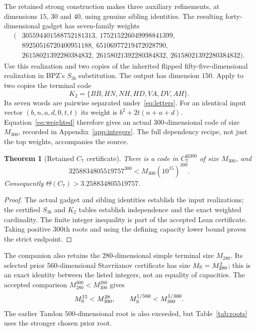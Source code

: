 \documentclass[11pt,a4paper]{article}
\newtheorem{theorem}{Theorem}[section]
\theoremstyle{definition}
\theoremstyle{remark}
\begin{document}
The retained strong construction makes three auxiliary refinements,
at dimensions $15$, $30$ and $40$, using genuine sibling identities.
The resulting forty-dimensional gadget has seven-family weights
\begin{align*}
 (&305594401588752181313,\ 175215226049998841399,\\
  &89250516720400951188,\ 65106977219472028790,\\
  &26158021392280384832,\ 26158021392280384832,\
    26158021392280384832).
\end{align*}
Use this realization and two copies of the inherited flipped
fifty-five-dimensional realization in BPZ's $S_{3b}$ substitution.
The output has dimension $150$. Apply to two copies the terminal code
\[
 K_2=\{BB,HN,NH,HD,VA,DV,AH\}.
\]
Its seven words are pairwise separated under~\eqref{eq:letters}. For
an identical input vector $(b,n,a,d,0,t,t)$ its weight is
$b^2+2t(n+a+d)$. Equation~\eqref{eq:weighted} therefore gives an
actual $300$-dimensional code of size $M_{300}$, recorded in
Appendix~\ref{app:integers}. The full dependency recipe, not just the
top weights, accompanies the source.

\begin{theorem}[Retained $C_7$ certificate]\label{thm:c7}
There is a code in $C_7^{\boxtimes300}$ of size $M_{300}$, and
\[
 3258834805519757^{300}<M_{300}(10^{15})^{300}.
\]
Consequently $\Theta(C_7)>3.258834805519757$.
\end{theorem}
\begin{proof}
The actual gadget and sibling identities establish the input
realizations; the certified $S_{3b}$ and $K_2$ tables establish
independence and the exact weighted cardinality. The finite integer
inequality is part of the accepted Lean certificate. Taking positive
$300$th roots and using the defining capacity lower bound proves
the strict endpoint.
\end{proof}

The companion also retains the $280$-dimensional simple terminal size
$M_{280}$. Its selected prior $560$-dimensional Stavriianov certificate
has size $M_{\rm S}=M_{280}^2$; this is an exact identity between the
listed integers, not an equality of capacities. The accepted comparison
$M_{280}^{300}<M_{300}^{280}$ gives
\[
 M_{\rm S}^{15}<M_{300}^{28},\qquad
 M_{\rm S}^{1/560}<M_{300}^{1/300}.
\]
The earlier Tandon $500$-dimensional root is also exceeded, but Table~\ref{tab:roots}
uses the stronger chosen prior root.
\end{document}
